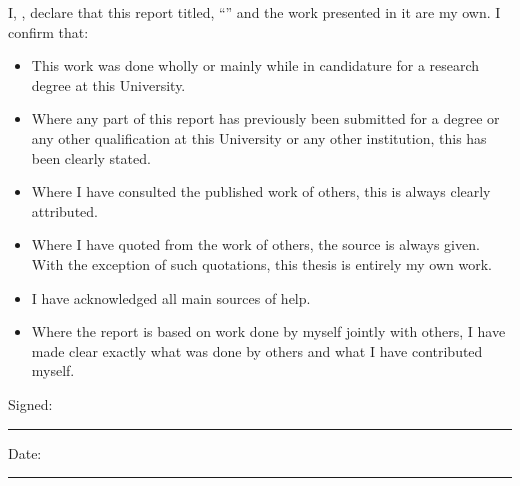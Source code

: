 \documentclass[
11pt, %
english, %
singlespacing, %
headsepline, %
]{MastersDoctoralThesis} %
\begin{document}

\begin{declaration}
\addchaptertocentry{\authorshipname} %

\noindent I, \authorname, declare that this report titled, \enquote{\ttitle} and the work presented in it are my own. I confirm that:

\begin{itemize}
\item This work was done wholly or mainly while in candidature for a research degree at this University.
\item Where any part of this report has previously been submitted for a degree or any other qualification at this University or any other institution, this has been clearly stated.
\item Where I have consulted the published work of others, this is always clearly attributed.
\item Where I have quoted from the work of others, the source is always given. With the exception of such quotations, this thesis is entirely my own work.
\item I have acknowledged all main sources of help.
\item Where the report is based on work done by myself jointly with others, I have made clear exactly what was done by others and what I have contributed myself.
\end{itemize}

\noindent Signed:\\
\rule[0.5em]{25em}{0.5pt} %

\noindent Date:\\
\rule[0.5em]{25em}{0.5pt} %
\end{declaration}


\end{document}
